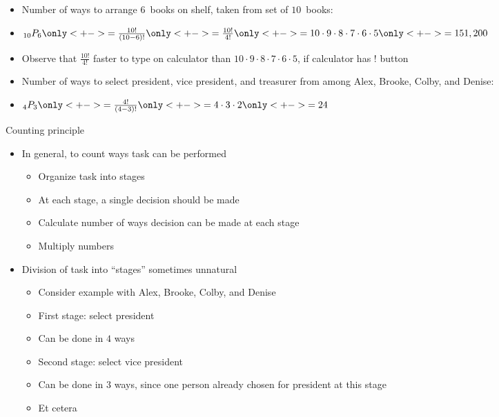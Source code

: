 \documentclass[handout]{beamer}
\theoremstyle{definition}
\begin{document}
\begin{frame}
\begin{example}
\begin{itemize}
\item Number of ways to arrange $6$~books
on shelf, taken from set of $10$~books:
\item $_{10}P_6
\only<+->{=\frac{10!}{\left(10-6\right)!}}
\only<+->{=\frac{10!}{4!}}
\only<+->{=10\cdot 9\cdot 8\cdot 7\cdot 6\cdot 5}
\only<+->{=151,200}$
\item Observe that $\frac{10!}{4!}$ faster to type
on calculator than 
$10\cdot 9\cdot 8\cdot 7\cdot 6\cdot 5$, if calculator
has \alert{$!$} button
\end{itemize}
\end{example}
\begin{example}
\begin{itemize}
\item Number of ways to select president, vice president,
and treasurer from among Alex, Brooke, Colby, and Denise:
\item $_4P_3
\only<+->{=\frac{4!}{\left(4-3\right)!}}
\only<+->{=4\cdot 3\cdot 2}
\only<+->{=24}$
\end{itemize}
\end{example}
\end{frame}

\begin{frame}{Counting principle}
\begin{itemize}
\item In general, to count ways task can be performed
\begin{itemize}
\item Organize task into stages
\item At each stage, a single decision should be made
\item Calculate number of ways decision can
be made at each stage
\item Multiply numbers
\end{itemize}
\item Division of task into ``stages'' sometimes unnatural
\begin{example}
\begin{itemize}
\item Consider example with Alex, Brooke, Colby, and Denise
\item First stage: select president
\item Can be done in $4$ ways
\item Second stage: select vice president
\item Can be done in $3$ ways, since one person already
chosen for president at this stage
\item Et cetera
\end{itemize}
\end{example}
\end{itemize}
\end{frame}
\end{document}

